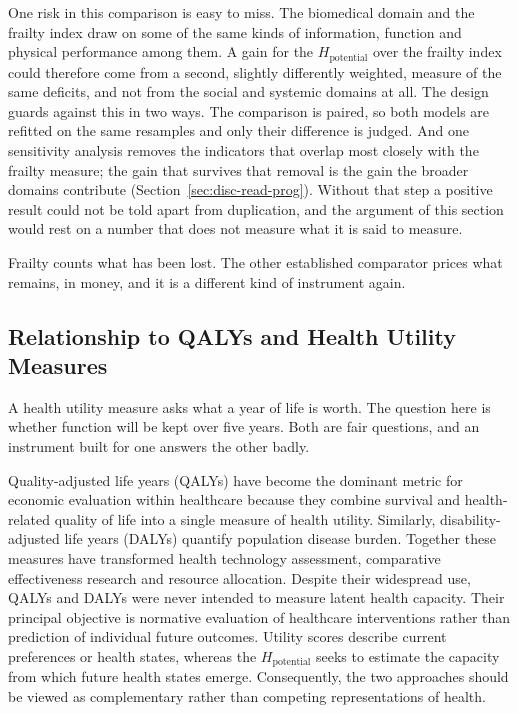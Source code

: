 One risk in this comparison is easy to miss. The biomedical domain and the frailty
index draw on some of the same kinds of information, function and physical
performance among them. A gain for the $H_{\text{potential}}$ over the frailty
index could therefore come from a second, slightly differently weighted, measure of
the same deficits, and not from the social and systemic domains at all. The design
guards against this in two ways. The comparison is paired, so both models are
refitted on the same resamples and only their difference is judged. And one
sensitivity analysis removes the indicators that overlap most closely with the
frailty measure; the gain that survives that removal is the gain the broader
domains contribute (Section~\ref{sec:disc-read-prog}). Without that step a positive
result could not be told apart from duplication, and the argument of this section
would rest on a number that does not measure what it is said to measure.

Frailty counts what has been lost. The other established comparator prices what
remains, in money, and it is a different kind of instrument again.

\subsection{Relationship to QALYs and Health Utility Measures}
\label{sec:disc-qaly}

A health utility measure asks what a year of life is worth. The question here
is whether function will be kept over five years. Both are fair questions, and
an instrument built for one answers the other badly.

Quality-adjusted life years (QALYs) have become the dominant metric for economic evaluation within healthcare because they combine survival and health-related quality of life into a single measure of health utility. Similarly, disability-adjusted life years (DALYs) quantify population disease burden. Together these measures have transformed health technology assessment, comparative effectiveness research and resource allocation. Despite their widespread use, QALYs and DALYs were never intended to measure latent health capacity. Their principal objective is normative evaluation of healthcare interventions rather than prediction of individual future outcomes. Utility scores describe current preferences or health states, whereas the $H_{\text{potential}}$ seeks to estimate the capacity from which future health states emerge. Consequently, the two approaches should be viewed as complementary rather than competing representations of health.

